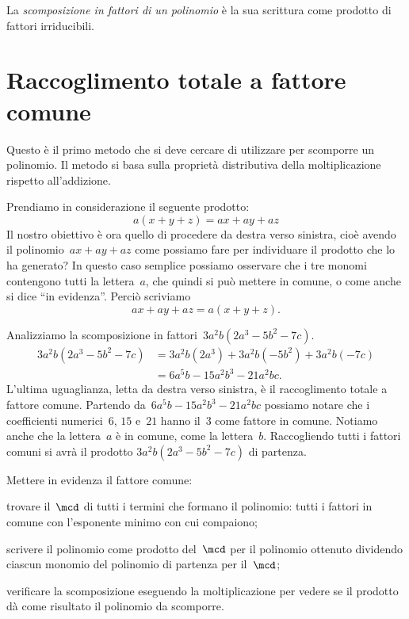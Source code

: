 \begin{definizione}
La \emph{scomposizione in fattori di un polinomio} è la sua scrittura come prodotto di fattori irriducibili.
\end{definizione}
\ovalbox{\risolvi \ref{ese:13.1}}

\section{Raccoglimento totale a fattore comune}
Questo è il primo metodo che si deve cercare di utilizzare per scomporre un polinomio.
Il metodo si basa sulla proprietà distributiva della moltiplicazione rispetto all'addizione.

Prendiamo in considerazione il seguente prodotto:\[a(x+y+z)=ax+ay+az\]
Il nostro obiettivo è ora quello di procedere
da destra verso sinistra, cioè avendo il polinomio~$ax+ay+az$ come possiamo fare per individuare il prodotto che lo ha generato?
In questo caso semplice possiamo osservare che i tre monomi contengono tutti la lettera~$a$, che quindi si può mettere in comune,
o come anche si dice ``in evidenza''.
Perciò scriviamo \[ax+ay+az=a(x+y+z).\]

\begin{exrig}
 \begin{esempio}
Analizziamo la scomposizione in fattori~$3a^{2}b\left(2a^{3}-5b^{2}-7c\right)$.
 \begin{equation*}
   \begin{split}
    3a^{2}b\left(2a^{3}-5b^{2}-7c\right) &=3a^{2}b(2a^{3})+3a^{2}b(-5b^{2})+3a^{2}b(-7c)\\
    &=6a^{5}b-15a^{2}b^{3}-21a^{2}bc.
   \end{split}
 \end{equation*}
L'ultima uguaglianza, letta da destra verso sinistra, è il raccoglimento totale a fattore comune.
Partendo da~$6a^{5}b-15a^{2}b^{3}-21a^{2}bc$ possiamo notare che i coefficienti numerici~$6$, $15$ e~$21$ hanno il~$3$ come fattore in comune.
Notiamo anche che la lettera~$a$ è in comune, come la lettera~$b$. Raccogliendo tutti i fattori comuni si avrà il prodotto
$3a^{2}b\left(2a^{3}-5b^{2}-7c\right)$ di partenza.
 \end{esempio}
\end{exrig}

\begin{procedura}
Mettere in evidenza il fattore comune:
\begin{enumeratea}
\item trovare il~$\mcd$ di tutti i termini che formano il polinomio: tutti i fattori in comune con l'esponente minimo con cui compaiono;
\item scrivere il polinomio come prodotto del~$\mcd$ per il polinomio ottenuto dividendo ciascun monomio del polinomio di partenza per il~$\mcd$;
\item verificare la scomposizione eseguendo la moltiplicazione per vedere se il prodotto dà come risultato il polinomio da scomporre.
\end{enumeratea}
\end{procedura}

